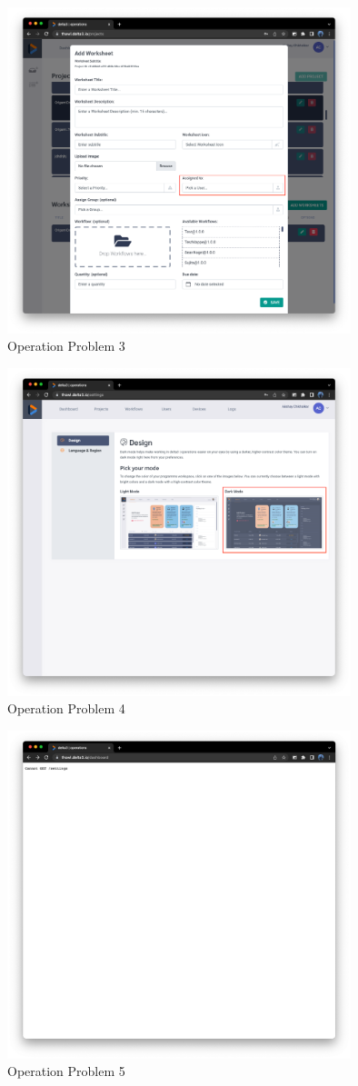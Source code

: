 \documentclass[conference,onecolumn]{IEEEtran}
\begin{document}
    \begin{figure}[H]
        \centerline{\includegraphics[width=100mm,scale=1]{./images/Operation_Problem_3.png}}
        \caption{Operation Problem 3}
        \label{Operation Problem 3}
    \end{figure}  
    \begin{figure}[H]
        \centerline{\includegraphics[width=100mm,scale=1]{./images/Operation_Problem_4.png}}
        \caption{Operation Problem 4}
        \label{Operation Problem 4}
    \end{figure}  
    \begin{figure}[H]
        \centerline{\includegraphics[width=100mm,scale=1]{./images/Operation_Problem_5.png}}
        \caption{Operation Problem 5}
        \label{Operation Problem 5}
    \end{figure}  


\newpage


\end{document}
